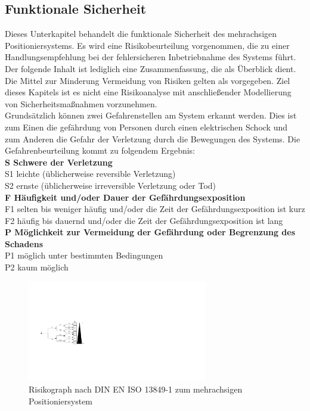 \documentclass[../../../Bachelorarbeit.tex]{subfiles}
\begin{document}
\subsection{Funktionale Sicherheit} \label{sicherheit}
Dieses Unterkapitel behandelt die funktionale Sicherheit des mehrachsigen Positioniersystems. Es wird eine Risikobeurteilung vorgenommen, die zu einer Handlungsempfehlung bei der fehlersicheren Inbetriebnahme des Systems führt. Der folgende Inhalt ist lediglich eine Zusammenfassung, die als Überblick dient. Die Mittel zur Minderung \bzw Vermeidung von Risiken gelten als vorgegeben. Ziel dieses Kapitels ist es nicht eine Risikoanalyse mit anschließender Modellierung von Sicherheitsmaßnahmen vorzunehmen.\\
\bigskip \newline
Grundsätzlich können zwei Gefahrenstellen am System erkannt werden. Dies ist zum Einen die gefährdung von Personen durch einen elektrischen Schock und zum Anderen die Gefahr der Verletzung durch die Bewegungen des Systems. Die Gefahrenbeurteilung kommt zu folgendem Ergebnis:\\
\bigskip \newline
\textbf{S Schwere der Verletzung}\\
S1 leichte (üblicherweise reversible Verletzung)\\
S2 ernste (üblicherweise irreversible Verletzung oder Tod)\\
\textbf{F Häufigkeit und/oder Dauer der Gefährdungsexposition}\\
F1 selten bis weniger häufig und/oder die Zeit der Gefährdungsexposition ist kurz\\
F2 häufig bis dauernd und/oder die Zeit der Gefährdungsexposition ist lang\\
\textbf{P Möglichkeit zur Vermeidung der Gefährdung oder Begrenzung des Schadens}\\
P1 möglich unter bestimmten Bedingungen\\
P2 kaum möglich

\begin{figure}[H]
    \centering
    \includegraphics[width=0.7\textwidth]{Images/Risikograph.pdf}
    \caption[Risikograph]{Risikograph nach DIN EN ISO 13849-1 zum mehrachsigen Positioniersystem}
    \label{fig:my-img103}
\end{figure}
\end{document}
